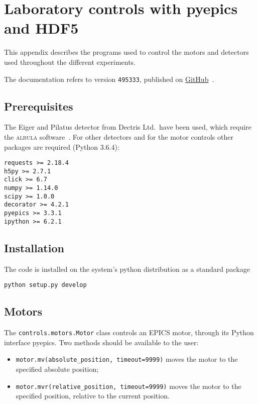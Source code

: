 \chapter{Laboratory controls with pyepics and HDF5}
This appendix describes the programs used to control the motors and
detectors used throughout the different experiments.

The documentation refers to version \texttt{495333}, published on 
\href{https://github.com/Enucatl/python-controls-high-energy/tree/495333d062067ada0331b8c688dd4067832981fc}{GitHub}~\cite{python-controls-high-energy}.

\section{Prerequisites}
The Eiger and Pilatus detector from Dectris Ltd.\ have been used, which
require the \textsc{albula} software~\cite{albula}. For other detectors and
for the motor controls other packages are required (Python 3.6.4):
\begin{lstlisting}
requests >= 2.18.4
h5py >= 2.7.1
click >= 6.7
numpy >= 1.14.0
scipy >= 1.0.0
decorator >= 4.2.1
pyepics >= 3.3.1
ipython >= 6.2.1
\end{lstlisting}

\section{Installation}
The code is installed on the system's python distribution as a standard
package
\begin{lstlisting}
python setup.py develop
\end{lstlisting}

\section{Motors}
The \texttt{controls.motors.Motor} class controls an EPICS motor, through
its Python interface pyepics. Two methods should be available to the user:
\begin{itemize}
    \item \verb|motor.mv(absolute_position, timeout=9999)| moves the motor
        to the specified absolute position;
    \item \verb|motor.mvr(relative_position, timeout=9999)| moves the motor
        to the specified position, relative to the current position.
\end{itemize}

